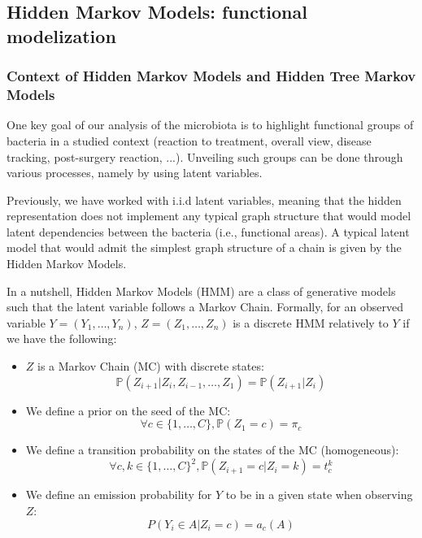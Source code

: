 \subsection{Hidden Markov Models: functional modelization}

\subsubsection{Context of Hidden Markov Models and Hidden Tree Markov Models}

One key goal of our analysis of the microbiota is to highlight functional groups of
bacteria in a studied context (reaction to treatment, overall view, disease tracking, post-surgery reaction, ...).
Unveiling such groups can be done through various processes, namely by using latent variables.

\medskip

Previously, we have worked with i.i.d latent variables, meaning that the hidden representation does not
implement any typical graph structure that would model latent dependencies between the bacteria (i.e., functional areas).
A typical latent model that would admit the simplest graph structure of a chain is given by the Hidden Markov Models.

\medskip

In a nutshell, Hidden Markov Models (HMM) are a class of generative models such that the latent variable follows a Markov Chain.
Formally, for an observed variable $Y = (Y_1, \dots, Y_n)$, $Z = (Z_1, \dots, Z_n)$ is a discrete HMM relatively to $Y$ if we have the following:
\begin{itemize}
    \item $Z$ is a Markov Chain (MC) with discrete states:
         $$
         \mathbb{P}(Z_{i+1} | Z_i, Z_{i-1}, \dots, Z_1) = \mathbb{P}(Z_{i+1} | Z_i)
         $$
    \item We define a prior on the seed of the MC:
         $$\forall c \in \{1, \dots, C\}, \mathbb{P}(Z_1 = c) = \pi_c$$

    \item We define a transition probability on the states of the MC (homogeneous):
        $$\forall c,k \in \{1, \dots, C\}^2, \mathbb{P}(Z_{i+1} = c | Z_i = k) = t_c^k$$

    \item We define an emission probability for $Y$ to be in a given state when observing $Z$:
        $$
        P(Y_i \in A | Z_i = c) = a_c(A)
        $$
\end{itemize}

